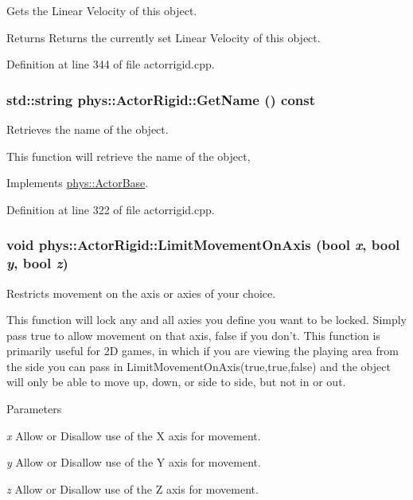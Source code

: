 Gets the Linear Velocity of this object. 

\begin{DoxyReturn}{Returns}
Returns the currently set Linear Velocity of this object. 
\end{DoxyReturn}


Definition at line 344 of file actorrigid.cpp.

\hypertarget{classphys_1_1ActorRigid_a63952e0b7ab7176ae60d96756dd84b43}{
\subsubsection[{GetName}]{\setlength{\rightskip}{0pt plus 5cm}std::string phys::ActorRigid::GetName () const}}
\label{d8/d71/classphys_1_1ActorRigid_a63952e0b7ab7176ae60d96756dd84b43}


Retrieves the name of the object. 

This function will retrieve the name of the object, 

Implements \hyperlink{classphys_1_1ActorBase_a8309f5bd133c936abe3a856b0240159f}{phys::ActorBase}.



Definition at line 322 of file actorrigid.cpp.

\hypertarget{classphys_1_1ActorRigid_adaed962ee8ed788612e541fb00867c78}{
\subsubsection[{LimitMovementOnAxis}]{\setlength{\rightskip}{0pt plus 5cm}void phys::ActorRigid::LimitMovementOnAxis (bool {\em x}, \/  bool {\em y}, \/  bool {\em z})}}
\label{d8/d71/classphys_1_1ActorRigid_adaed962ee8ed788612e541fb00867c78}


Restricts movement on the axis or axies of your choice. 

This function will lock any and all axies you define you want to be locked. Simply pass true to allow movement on that axis, false if you don't. This function is primarily useful for 2D games, in which if you are viewing the playing area from the side you can pass in LimitMovementOnAxis(true,true,false) and the object will only be able to move up, down, or side to side, but not in or out. 
\begin{DoxyParams}{Parameters}
\item[{\em x}]Allow or Disallow use of the X axis for movement. \item[{\em y}]Allow or Disallow use of the Y axis for movement. \item[{\em z}]Allow or Disallow use of the Z axis for movement. \end{DoxyParams}



